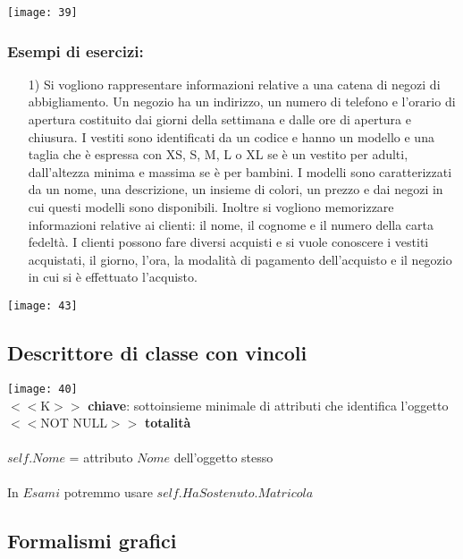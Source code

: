 \documentclass[12pt, letterpaper]{article}
\begin{document}
\begin{center}\texttt{[image: 39]}\end{center}

\newpage

\subsubsection{Esempi di esercizi:}

\begin{itemize}
   \item[1)] Si vogliono rappresentare informazioni relative a una catena di negozi di abbigliamento. Un negozio ha un indirizzo, un numero di telefono e l’orario di apertura costituito dai giorni della settimana e dalle ore di apertura e chiusura. I vestiti sono identificati da un codice e hanno un modello e una taglia che è espressa con XS, S, M, L o XL se è un vestito per adulti, dall’altezza minima e massima se è per bambini. I modelli sono caratterizzati da un nome, una descrizione, un insieme di colori, un prezzo e dai negozi in cui questi modelli sono disponibili. Inoltre si vogliono memorizzare informazioni relative ai clienti: il nome, il cognome e il numero della carta fedeltà. I clienti possono fare diversi acquisti e si vuole conoscere i vestiti acquistati, il giorno, l’ora, la modalità di pagamento dell’acquisto e il negozio in cui si è effettuato l’acquisto. 
\end{itemize}

\texttt{[image: 43]}

\subsection{Descrittore di classe con vincoli}

\texttt{[image: 40]}
\\
$<<$K$>>$\textbf{ chiave}: sottoinsieme minimale di attributi che identifica l'oggetto 
\\
$<<$NOT NULL$>>$ \textbf{totalità}
\\
\\
$self.Nome$ = attributo $Nome$ dell'oggetto stesso
\\
\\
In $Esami$ potremmo usare $self.HaSostenuto.Matricola$

\subsection{Formalismi grafici}
\end{document}

